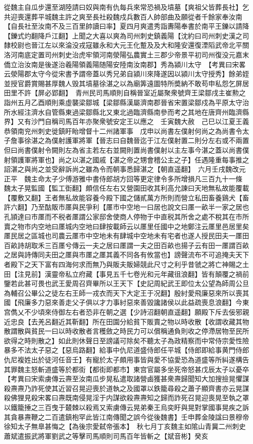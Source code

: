 從魏主自瓜步還至湖陸請曰奴與南有仇每兵來常恐禍及墳墓【爽祖父皆葬長社】乞共迎喪還葬平城魏主許之爽至長社殺魏戍兵數百人帥部曲及願從者千餘家奉汝南【自長社至汝南不及三百里帥讀曰率】夏四月爽遣秀詣夀陽奉書於南平王鑠以請降【鑠式灼翻降戶江翻】上聞之大喜以爽為司州刺史鎮義陽【沈約曰司州刺史漢之司隸校尉也晉江左以來淪没戎寇雖永和大元王化蹔及及大和隆安還復湮䧟武帝北平關洛河南底定置司州刺史治虎牢領河南滎陽弘農實土三郡少帝景平初司州復没元嘉末僑立治汝南是後遂治羲陽領義陽随陽安陸南汝南郡】秀為潁川太守　【考異曰宋畧云滎陽郡太守今從宋書予謂帝蓋以秀兄弟自潁川來降遂因以潁川太守授秀】餘弟姪並授官爵賞賜甚厚魏人毁其墳墓徐湛之以為廟筭遠圖特所奬納不敢苟申私怨乞屏居田里不許【屏必郢翻】　青州民司馬順則自稱晉室近屬聚衆號齊王梁鄒戌主崔勲之詣州五月乙酉順則乘虛襲梁鄒城【梁鄒縣漢屬濟南郡晉省宋置梁鄒戍為平原太守治所水經注濟水自管縣東過梁鄒縣北又東北過臨濟縣南參而考之其地在唐齊州臨濟縣界】又有沙門自稱司馬百年亦聚衆號安定王以應之　壬寅魏大赦　己巳以江夏王義恭領南兖州刺史徙鎮盱眙增督十二州諸軍事　戊申以尚書左僕射何尚之為尚書令太子詹事徐湛之為僕射護軍將軍【晉志曰自魏晉迄于江左僕射置二則分左右或不兩置但曰尚書僕射令闕則左為省主若左右並闕則置尚書僕射以主左事今湛之蓋以尚書僕射領護軍將軍也】尚之以湛之國戚【湛之帝之甥會稽公主之子】任遇隆重每事推之詔湛之與尚之並受辭訴尚之雖為令而朝事悉歸湛之【朝直遥翻】　六月壬戌魏改元正平　魏主命太子少傅游雅中書侍郎胡方回等更定律令多所增損凡三百九十一條　魏太子晃監國【監工衘翻】頗信任左右又營園田收其利高允諫曰天地無私故能覆載【覆敷又翻】王者無私故能容養今殿下國之儲貳萬方所則而營立私田畜養鷄犬【畜許六翻】乃至酤販市㕓與民爭利【㕓市中空地一曰居也說文曰㕓一畝半一家之居也孔頴達曰市㕓而不税者㕓謂公家邸舍使商人停物于中直税其所舍之處不稅其在市所賣之物市内空地曰㕓城内空地曰肆按載師云以㕓里任國中之地鄭注云㕓里邑居里矣㕓民居之區城也司農云㕓市中空地未有肆城中空地未有宅者也遂人授民田夫一㕓田百畝詩胡取禾三百㕓兮傳云一夫之居曰㕓謂一夫之田百畝也揚子云有田一㕓謂百畝之居與詩傳同夫田之㕓與市㕓之㕓其義不同各有攸當也】謗聲流布不可追掩夫天下者殿下之天下富有四海何求而無乃與販夫販婦競此尺寸之利乎昔虢之將亡神賜之土田【注見前】漢靈帝私立府藏【事見五千七卷光和元年藏徂浪翻】皆有顛覆之禍前鑒若此甚可畏也武王愛周召齊畢所以王天下【史記周紀武王即位太公望為師周公旦為輔召公畢公之徒左右王師一戎衣而天下大定王于况翻】殷紂愛飛廉惡來所以喪其國【飛廉多力惡來善走父子俱以才力事紂惡來善毀讒諸侯以此益疏喪息浪翻】今東宫儁乂不少頃來侍御左右者恐非在朝之選【少詩沼翻朝直遥翻】願殿下斥去佞邪親近忠良【去羌呂翻近其靳翻】所在田園分給貧下販賣之物以時收散【收謂收藏其物散謂散與貧民一曰以時收散者言穫斂之時民力可以償稱通負則收之停滯居物至民所欲得之時則散之】如此則休聲日至謗議可除矣不聽太子為政精察而中常侍宗愛性險暴多不法太子惡之【惡烏路翻】給事中仇尼道盛侍郎任平城【侍郎即給事黄門侍郎仇尼複姓出於徒河任音壬】有寵於太子頗用事皆與愛不協愛恐為道盛等所糾遂構告其罪魏主怒斬道盛等於都街【都街即都市】東宫官屬多坐死帝怒甚戊辰太子以憂卒　【考異曰宋索虜傳云燾至汝南瓜步晃私遣取諸營鹵獲甚衆燾歸聞知大加搜撿晃懼謀殺燾燾乃詐死使其近習召晃迎喪於道執之及國罩以鉄籠尋殺之蕭子顯齊書亦云晃謀殺佛狸見殺宋畧曰燾既南侵晃淫于内謀欲殺燾燾知之歸而詐死召晃迎喪晃至執之罩以鐵籠捶之三百曳于樷棘以殺焉又索虜傳云晃弟秦王烏奕盱與晃對掌國事晃疾之訴其貪暴燾鞭之二百遣鎮枹罕此皆江南傳聞之誤今從後魏書】壬申葬金陵諡曰景穆帝徐知太子無臯甚悔之【為後宗愛弑帝張本】　秋七月丁亥魏主如隂山青冀二州刺史蕭斌遣振武將軍劉武之等擊司馬順則司馬百年皆斬之【斌音彬】癸亥
